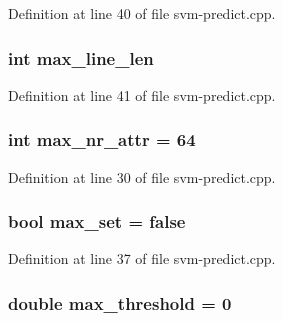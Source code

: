 Definition at line 40 of file svm-\/predict.\-cpp.

\hypertarget{svm-predict_8cpp_acad24c15bee67d2026f56bc94a1188c7}{
\subsubsection[{max\-\_\-line\-\_\-len}]{\setlength{\rightskip}{0pt plus 5cm}int max\-\_\-line\-\_\-len\hspace{0.3cm}{\ttfamily [static]}}}\label{svm-predict_8cpp_acad24c15bee67d2026f56bc94a1188c7}


Definition at line 41 of file svm-\/predict.\-cpp.

\hypertarget{svm-predict_8cpp_af95bde9162db2c5dd97e80795b3548ed}{
\subsubsection[{max\-\_\-nr\-\_\-attr}]{\setlength{\rightskip}{0pt plus 5cm}int max\-\_\-nr\-\_\-attr = 64}}\label{svm-predict_8cpp_af95bde9162db2c5dd97e80795b3548ed}


Definition at line 30 of file svm-\/predict.\-cpp.

\hypertarget{svm-predict_8cpp_acd0f485f4131af58e0bdb273316d3805}{
\subsubsection[{max\-\_\-set}]{\setlength{\rightskip}{0pt plus 5cm}bool max\-\_\-set = false}}\label{svm-predict_8cpp_acd0f485f4131af58e0bdb273316d3805}


Definition at line 37 of file svm-\/predict.\-cpp.

\hypertarget{svm-predict_8cpp_a9090dc0b930a5f9212a3b6f3e4b5c5ab}{
\subsubsection[{max\-\_\-threshold}]{\setlength{\rightskip}{0pt plus 5cm}double max\-\_\-threshold = 0}}\label{svm-predict_8cpp_a9090dc0b930a5f9212a3b6f3e4b5c5ab}


